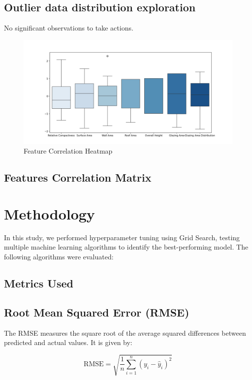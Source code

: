 \documentclass{article}
\begin{document}
\subsection{Outlier data distribution exploration}
No significant observations to take actions.

\begin{figure}[H]  
    \centering
    \includegraphics[width=1\linewidth]{BoxPlot.png}
    \caption{Feature Correlation Heatmap}
    \vspace{-1em} %
\end{figure}
\subsection{Features Correlation Matrix}

\section{Methodology}
In this study, we performed hyperparameter tuning using Grid Search, testing multiple machine learning algorithms to identify the best-performing model. The following algorithms were evaluated:

\subsection{Metrics Used}

\subsection*{Root Mean Squared Error (RMSE)}

The RMSE measures the square root of the average squared differences between predicted and actual values. It is given by:

\[
\text{RMSE} = \sqrt{\frac{1}{n} \sum_{i=1}^n (y_i - \hat{y}_i)^2}
\]
\end{document}
